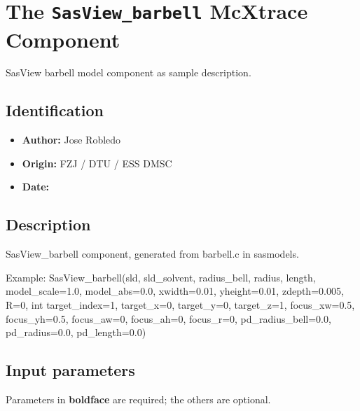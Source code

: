\section{The \texttt{SasView\_barbell} McXtrace Component}
SasView barbell model component as sample description.

\subsection*{Identification}
\begin{itemize}
  \item \textbf{Author:} Jose Robledo
  \item \textbf{Origin:} FZJ / DTU / ESS DMSC
  \item \textbf{Date:} 
\end{itemize}

\subsection*{Description}
SasView\_barbell component, generated from barbell.c in sasmodels.

Example: SasView\_barbell(sld, sld\_solvent, radius\_bell, radius, length, model\_scale=1.0, model\_abs=0.0, xwidth=0.01, yheight=0.01, zdepth=0.005, R=0, int target\_index=1, target\_x=0, target\_y=0, target\_z=1, focus\_xw=0.5, focus\_yh=0.5, focus\_aw=0, focus\_ah=0, focus\_r=0, pd\_radius\_bell=0.0, pd\_radius=0.0, pd\_length=0.0)

\subsection*{Input parameters}
Parameters in \textbf{boldface} are required; the others are optional.

